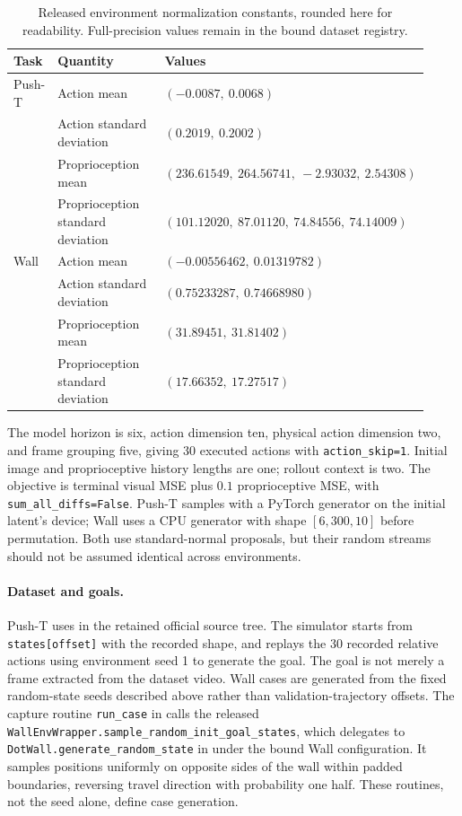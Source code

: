 \begin{table}[h]
\caption{Released environment normalization constants, rounded here for
readability. Full-precision values remain in the bound dataset registry.}
\label{tab:normalization}
\centering\small
\begin{tabular}{@{}p{0.10\linewidth}p{0.32\linewidth}p{0.50\linewidth}@{}}
\toprule
Task & Quantity & Values\\
\midrule
Push-T & Action mean & $(-0.0087,\ 0.0068)$\\
 & Action standard deviation & $(0.2019,\ 0.2002)$\\
 & Proprioception mean & $(236.61549,\ 264.56741,\ -2.93032,\ 2.54308)$\\
 & Proprioception standard deviation & $(101.12020,\ 87.01120,\ 74.84556,\ 74.14009)$\\
Wall & Action mean & $(-0.00556462,\ 0.01319782)$\\
 & Action standard deviation & $(0.75233287,\ 0.74668980)$\\
 & Proprioception mean & $(31.89451,\ 31.81402)$\\
 & Proprioception standard deviation & $(17.66352,\ 17.27517)$\\
\bottomrule
\end{tabular}
\end{table}

The model horizon is six, action dimension ten, physical action dimension two,
and frame grouping five, giving 30 executed actions with
\texttt{action\_skip=1}. Initial image and proprioceptive history lengths are
one; rollout context is two. The objective is terminal visual MSE plus
$0.1$ proprioceptive MSE, with \texttt{sum\_all\_diffs=False}.
Push-T samples with a PyTorch generator on the initial latent's device;
Wall uses a CPU generator with shape $[6,300,10]$ before permutation.
Both use standard-normal proposals, but their random streams should not be
assumed identical across environments.

\paragraph{Dataset and goals.}
Push-T uses  in the retained official source tree.
The simulator starts from \texttt{states[offset]} with the recorded shape,
and replays the 30 recorded relative actions using environment seed 1 to
generate the goal. The goal is not merely a frame extracted from the dataset
video. Wall cases are generated from the fixed random-state seeds described
above rather than validation-trajectory offsets. The capture routine
\texttt{run\_case} in  calls the released
\texttt{WallEnvWrapper.sample\_random\_init\_goal\_states}, which delegates to
\texttt{DotWall.generate\_random\_state} in
 under the bound
Wall configuration. It samples positions uniformly on opposite sides of the
wall within padded boundaries, reversing travel direction with probability
one half. These routines, not the seed alone, define case generation.

